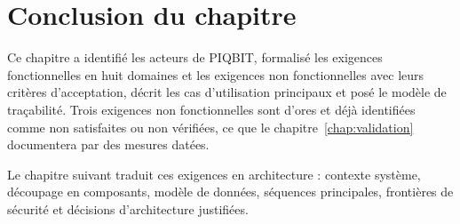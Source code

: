 \section{Conclusion du chapitre}
\label{sec:req_conclusion}

Ce chapitre a identifié les acteurs de PIQBIT, formalisé les exigences
fonctionnelles en huit domaines et les exigences non fonctionnelles avec leurs
critères d'acceptation, décrit les cas d'utilisation principaux et posé le
modèle de traçabilité. Trois exigences non fonctionnelles sont d'ores et déjà
identifiées comme non satisfaites ou non vérifiées, ce que le
chapitre~\ref{chap:validation} documentera par des mesures datées.

Le chapitre suivant traduit ces exigences en architecture : contexte système,
découpage en composants, modèle de données, séquences principales, frontières
de sécurité et décisions d'architecture justifiées.
